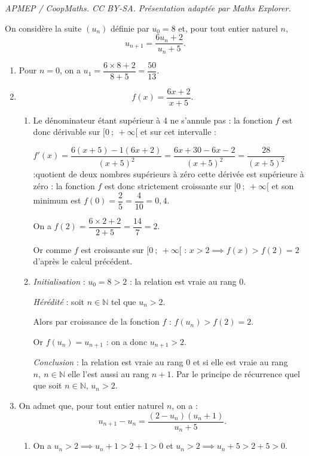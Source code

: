 \documentclass[10pt]{article}
\providecommand{\N}{\mathbb{N}}
\begin{document}
\noindent\textit{APMEP / CoopMaths. CC BY-SA. Présentation adaptée par Maths Explorer.}\par\medskip
\medskip

On considère la suite $\left(u_n\right)$ définie par $u_0 = 8$ et, pour tout entier naturel $n$,
\[u_{n +1} = \dfrac{6u_n + 2}{u_n +5}.\]

\smallskip

\begin{enumerate}
\item 
Pour $n = 0$, on a $u_1 = \dfrac{6 \times 8 + 2}{8 + 5} = \dfrac{50}{13}$.
\item 
\[f(x) = \dfrac{6x + 2 }{x +5}.\]


	\begin{enumerate}
		\item 
		Le dénominateur étant supérieur à 4 ne s'annule pas : la fonction $f$ est donc dérivable sur $[0~;~+\infty[$ et sur cet intervalle :
		
$f'(x) = \dfrac{6(x + 5) - 1(6x + 2)}{(x + 5)^2} = \dfrac{6x + 30 - 6x - 2}{(x + 5)^2} = \dfrac{28}{(x + 5)^2}$ :quotient de deux nombres supérieurs à zéro cette dérivée est supérieure à zéro : la fonction $f$ est donc strictement croissante sur $[0~;~+\infty[$ et son minimum est $f(0) = \dfrac25 = \dfrac{4}{10} = 0,4$.
		

On a $f(2) = \dfrac{6\times 2 + 2}{2 + 5} = \dfrac{14}{7} = 2$.

Or comme $f$ est croissante sur $[0~;~+\infty[$ :
$x > 2 \implies f(x) > f(2) = 2$ d'après le calcul précédent.

		\item 
\emph{Initialisation} : $u_0 = 8 > 2$ : la relation est vraie au rang $0$.
	
\emph{Hérédité} : soit $n \in \N$ tel que $u_n > 2$.

Alors par croissance de la fonction $f$ : $f\left(u_n\right) > f(2) = 2$.

Or $f\left(u_n\right) = u_{n+1}$ : on a donc $u_{n+1} > 2$.

\emph{Conclusion} : la relation est vraie au rang $0$ et si elle est vraie au rang $n, \: n \in \N$ elle l'est aussi au rang $n + 1$. Par le principe de récurrence quel que soit $n \in \N$, \: $u_n > 2$.
	\end{enumerate}
\item On admet que, pour tout entier naturel $n$, on a :
\[u_{n+1} - u_n = \dfrac{\left(2 - u_n\right)\left(u_n + 1\right)}{u_n +5}.\]

	\begin{enumerate}
		\item 
		On a $u_n > 2 \implies u_n + 1 > 2 + 1 > 0$ et $u_n > 2 \implies u_n + 5 > 2 + 5 > 0$.
		

\end{enumerate}
\end{enumerate}
\end{document}
